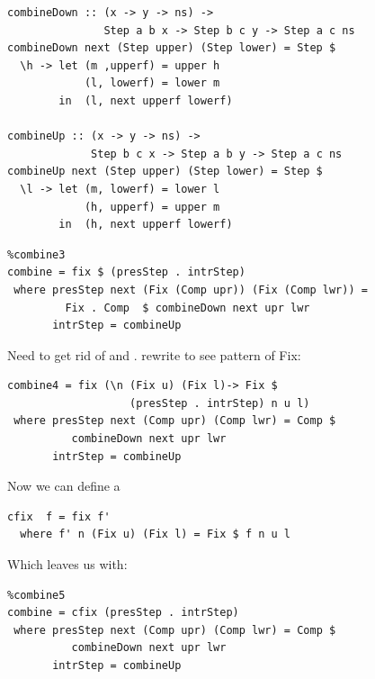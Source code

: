 \documentclass[preprint,natbib]{sigplanconf}
\begin{document}
\begin{small} %
\begin{verbatim}
combineDown :: (x -> y -> ns) ->
               Step a b x -> Step b c y -> Step a c ns
combineDown next (Step upper) (Step lower) = Step $
  \h -> let (m ,upperf) = upper h
            (l, lowerf) = lower m
        in  (l, next upperf lowerf)   

combineUp :: (x -> y -> ns) -> 
             Step b c x -> Step a b y -> Step a c ns
combineUp next (Step upper) (Step lower) = Step $ 
  \l -> let (m, lowerf) = lower l
            (h, upperf) = upper m
        in  (h, next upperf lowerf)   
\end{verbatim}%
\end{small}

\begin{small}
\begin{verbatim}%combine3
combine = fix $ (presStep . intrStep) 
 where presStep next (Fix (Comp upr)) (Fix (Comp lwr)) =
         Fix . Comp  $ combineDown next upr lwr  
       intrStep = combineUp
\end{verbatim}%
\end{small}

Need to get rid of  and . rewrite to see pattern of Fix:

\begin{small}
\begin{verbatim}
combine4 = fix (\n (Fix u) (Fix l)-> Fix $
                   (presStep . intrStep) n u l) 
 where presStep next (Comp upr) (Comp lwr) = Comp $ 
          combineDown next upr lwr  
       intrStep = combineUp
\end{verbatim}
\end{small}

Now we can define a 
\begin{small}
\begin{verbatim}
cfix  f = fix f' 
  where f' n (Fix u) (Fix l) = Fix $ f n u l
\end{verbatim}%
\end{small}

Which leaves us with:

\begin{small}
\begin{verbatim}%combine5
combine = cfix (presStep . intrStep)
 where presStep next (Comp upr) (Comp lwr) = Comp $ 
          combineDown next upr lwr  
       intrStep = combineUp
\end{verbatim}%
\end{small}
\end{document}
